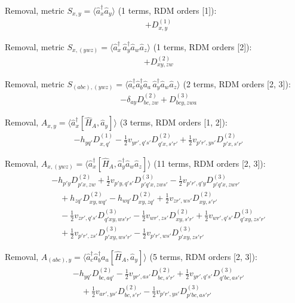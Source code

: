 
\noindent Removal, metric $S_{x,y}=\langle \hat a_x^\dagger \hat a_y\rangle$ (1 terms, RDM orders [1]):
\begin{align*}
&+D^{(1)}_{x,y}
\end{align*}

\noindent Removal, metric $S_{x,(ywz)}=\langle \hat a_x^\dagger\,\hat a_y^\dagger \hat a_w\hat a_z\rangle$ (1 terms, RDM orders [2]):
\begin{align*}
&+D^{(2)}_{xy,zw}
\end{align*}

\noindent Removal, metric $S_{(abc),(ywz)}=\langle \hat a_c^\dagger \hat a_b^\dagger \hat a_a\,\hat a_y^\dagger \hat a_w\hat a_z\rangle$ (2 terms, RDM orders [2, 3]):
\begin{align*}
&-\delta_{ay}D^{(2)}_{bc,zw}+D^{(3)}_{bcy,zwa}
\end{align*}

\noindent Removal, $A_{x,y}=\langle \hat a_x^\dagger[\hat H_A,\hat a_y]\rangle$ (3 terms, RDM orders [1, 2]):
\begin{align*}
&-h_{yq'}D^{(1)}_{x,q'}-\tfrac12v_{yr',q's'}D^{(2)}_{q'x,s'r'}+\tfrac12v_{p'r',ys'}D^{(2)}_{p'x,s'r'}
\end{align*}

\noindent Removal, $A_{x,(ywz)}=\langle \hat a_x^\dagger[\hat H_A,\hat a_y^\dagger \hat a_w\hat a_z]\rangle$ (11 terms, RDM orders [2, 3]):
\begin{align*}
&-h_{p'y}D^{(2)}_{p'x,zw}+\tfrac12v_{p'y,q's'}D^{(3)}_{p'q'x,zws'}-\tfrac12v_{p'r',q'y}D^{(3)}_{p'q'x,zwr'} \\
&\quad +h_{zq'}D^{(2)}_{xy,wq'}-h_{wq'}D^{(2)}_{xy,zq'}+\tfrac12v_{zr',ws'}D^{(2)}_{xy,s'r'} \\
&\quad -\tfrac12v_{zr',q's'}D^{(3)}_{q'xy,ws'r'}-\tfrac12v_{wr',zs'}D^{(2)}_{xy,s'r'}+\tfrac12v_{wr',q's'}D^{(3)}_{q'xy,zs'r'} \\
&\quad +\tfrac12v_{p'r',zs'}D^{(3)}_{p'xy,ws'r'}-\tfrac12v_{p'r',ws'}D^{(3)}_{p'xy,zs'r'}
\end{align*}

\noindent Removal, $A_{(abc),y}=\langle \hat a_c^\dagger \hat a_b^\dagger \hat a_a[\hat H_A,\hat a_y]\rangle$ (5 terms, RDM orders [2, 3]):
\begin{align*}
&-h_{yq'}D^{(2)}_{bc,aq'}-\tfrac12v_{yr',as'}D^{(2)}_{bc,s'r'}+\tfrac12v_{yr',q's'}D^{(3)}_{q'bc,as'r'} \\
&\quad +\tfrac12v_{ar',ys'}D^{(2)}_{bc,s'r'}-\tfrac12v_{p'r',ys'}D^{(3)}_{p'bc,as'r'}
\end{align*}

